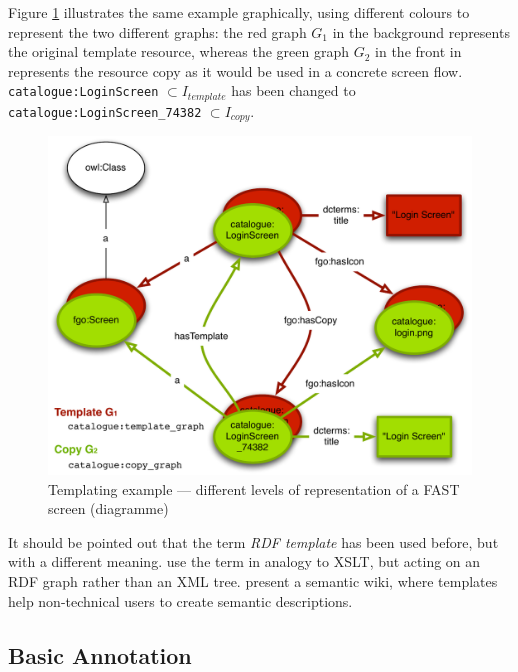 \documentclass[twoside]{fast_latex}
\begin{document}
\singlespacing
{}
\begin{figure}
	
\end{figure}
\doublespacing

Figure \ref{fig:templating_example_graph} illustrates the same example graphically, using different colours to represent the two different graphs: the red graph $G_1$ in the background represents the original template resource, whereas the green graph $G_2$ in the front in represents the resource copy as it would be used in a concrete screen flow. \texttt{catalogue:LoginScreen} $\subset I_{template}$ has been changed to \texttt{catalogue:LoginScreen\_74382} $\subset I_{copy}$.

\begin{figure}
  \begin{center}
    \includegraphics[width=.75\linewidth]{images/templating_example.pdf}
    \caption{Templating example --- different levels of representation of a FAST screen (diagramme)}
    \label{fig:templating_example_graph}
  \end{center}
\end{figure}


It should be pointed out that the term \emph{RDF template} has been used before, but with a different meaning. \cite{davis2003rdf_template} use the term in analogy to XSLT, but acting on an RDF graph rather than an XML tree. \cite{kawamoto2006kawawiki} present a semantic wiki, where templates help non-technical users to create semantic descriptions. 

\subsection{Basic Annotation} %
\label{sub:basic_annotation}
\end{document}
